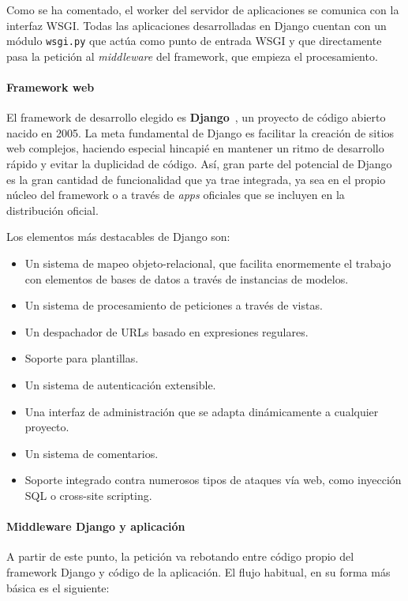 Como se ha comentado, el worker del servidor de aplicaciones se comunica con la
interfaz WSGI. Todas las aplicaciones desarrolladas en Django cuentan con un
módulo \texttt{wsgi.py} que actúa como punto de entrada WSGI y que directamente
pasa la petición al \textit{middleware} del framework, que empieza el procesamiento.

\paragraph{Framework web}

El framework de desarrollo elegido es \textbf{Django}~\cite{django}, un
proyecto de código abierto nacido en 2005. La meta fundamental de Django es
facilitar la creación de sitios web complejos, haciendo especial hincapié en
mantener un ritmo de desarrollo rápido y evitar la duplicidad de código. Así,
gran parte del potencial de Django es la gran cantidad de funcionalidad que ya
trae integrada, ya sea en el propio núcleo del framework o a través de
\textit{apps} oficiales que se incluyen en la distribución oficial.

Los elementos más destacables de Django son:

\begin{itemize}
\item Un sistema de mapeo objeto-relacional, que facilita enormemente el trabajo
  con elementos de bases de datos a través de instancias de modelos.
\item Un sistema de procesamiento de peticiones a través de vistas.
\item Un despachador de URLs basado en expresiones regulares.
\item Soporte para plantillas.
\item Un sistema de autenticación extensible.
\item Una interfaz de administración que se adapta dinámicamente a cualquier proyecto.
\item Un sistema de comentarios.
\item Soporte integrado contra numerosos tipos de ataques vía web, como
  inyección SQL o cross-site scripting.
\end{itemize}


\paragraph{Middleware Django y aplicación}

A partir de este punto, la petición va rebotando entre código propio del
framework Django y código de la aplicación. El flujo habitual, en su forma más
básica es el siguiente:

